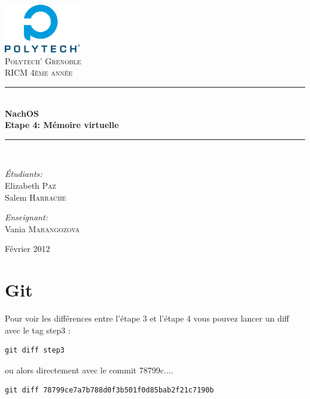 \documentclass[a4paper,10pt]{article}
\newcommand{\HRule}{\rule{\linewidth}{0.6mm}}
\begin{document}
\begin{titlepage}

\begin{center}


\includegraphics[width=0.25\textwidth]{../images/logo}\\[1cm]

\textsc{\LARGE Polytech' Grenoble}\\[1.5cm]

\textsc{\Large RICM 4\`eme ann\'ee}\\[1.2cm]


\HRule \\[0.4cm]
{ \huge \bfseries NachOS\\[0.6cm]
Etape 4: Mémoire virtuelle}
\\[0.4cm]

\HRule \\[2cm]

\begin{minipage}{0.4\textwidth}
\begin{flushleft} \large
\emph{\'Etudiants:}\\
Elizabeth \textsc{Paz} \\
Salem \textsc{Harrache}
\end{flushleft}
\end{minipage}
\begin{minipage}{0.4\textwidth}
\begin{flushright} \large
\emph{Enseignant:} \\
Vania \textsc{Marangozova}
\end{flushright}
\end{minipage}

\vfill

{\large  Février 2012}

\end{center}

\end{titlepage}

\section{Git}

Pour voir les différences entre l'étape 3 et l'étape 4 vous pouvez lancer un
diff avec le tag step3 :
\begin{lstlisting}
git diff step3
\end{lstlisting}
ou alors directement avec le commit 78799c....
\begin{lstlisting}
git diff 78799ce7a7b788d0f3b501f0d85bab2f21c7190b
\end{lstlisting}
\end{document}
